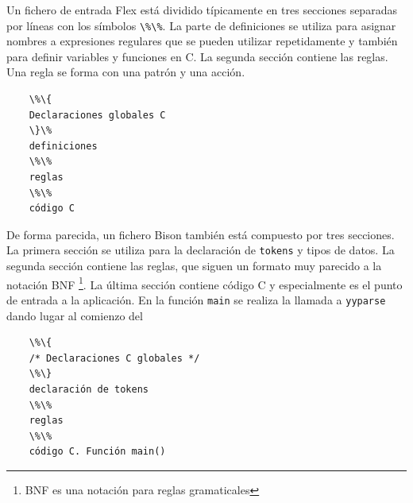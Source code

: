 Un fichero de entrada Flex está dividido típicamente en tres secciones separadas por líneas con los símbolos \verb|\%\%|. La parte de definiciones se utiliza para asignar nombres a expresiones regulares que se pueden utilizar repetidamente y también para definir variables y funciones en C. La segunda sección contiene las reglas. Una regla se forma con una patrón y una acción.

\begin{verbatim}
    \%\{
    Declaraciones globales C
    \}\%
    definiciones
    \%\% 
    reglas
    \%\% 
    código C
\end{verbatim}

De forma parecida, un fichero Bison también está compuesto por tres secciones. La primera sección se utiliza para la declaración de \verb|tokens| y tipos de datos. La segunda sección contiene las reglas, que siguen un formato muy parecido a la notación BNF \footnote{BNF es una notación para reglas gramaticales}. La última sección contiene código C y especialmente es el punto de entrada a la aplicación. En la función \verb|main| se realiza la llamada a \verb|yyparse| dando lugar al comienzo del %

\begin{verbatim}
    \%\{
    /* Declaraciones C globales */
    \%\}
    declaración de tokens
    \%\%
    reglas
    \%\%
    código C. Función main()
\end{verbatim}





%
%
%
%
